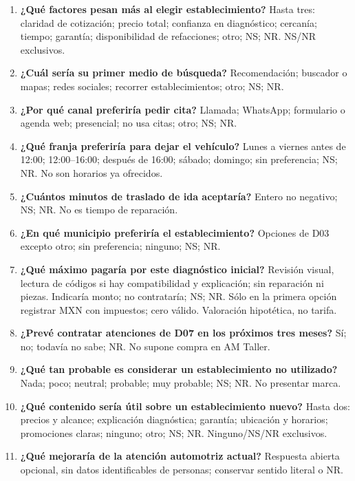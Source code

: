{\begin{enumerate}
\item[D12.] \textbf{¿Qué factores pesan más al elegir establecimiento?} Hasta tres: claridad de cotización; precio total; confianza en diagnóstico; cercanía; tiempo; garantía; disponibilidad de refacciones; otro; NS; NR. NS/NR exclusivos.
\item[D13.] \textbf{¿Cuál sería su primer medio de búsqueda?} Recomendación; buscador o mapas; redes sociales; recorrer establecimientos; otro; NS; NR.
\item[D14.] \textbf{¿Por qué canal preferiría pedir cita?} Llamada; WhatsApp; formulario o agenda web; presencial; no usa citas; otro; NS; NR.
\item[D15.] \textbf{¿Qué franja preferiría para dejar el vehículo?} Lunes a viernes antes de 12:00; 12:00--16:00; después de 16:00; sábado; domingo; sin preferencia; NS; NR. No son horarios ya ofrecidos.
\item[D16.] \textbf{¿Cuántos minutos de traslado de ida aceptaría?} Entero no negativo; NS; NR. No es tiempo de reparación.
\item[D17.] \textbf{¿En qué municipio preferiría el establecimiento?} Opciones de D03 excepto otro; sin preferencia; ninguno; NS; NR.
\item[D18.] \textbf{¿Qué máximo pagaría por este diagnóstico inicial?} Revisión visual, lectura de códigos si hay compatibilidad y explicación; sin reparación ni piezas. Indicaría monto; no contrataría; NS; NR. Sólo en la primera opción registrar MXN con impuestos; cero válido. Valoración hipotética, no tarifa.
\item[D19.] \textbf{¿Prevé contratar atenciones de D07 en los próximos tres meses?} Sí; no; todavía no sabe; NR. No supone compra en AM Taller.
\item[D20.] \textbf{¿Qué tan probable es considerar un establecimiento no utilizado?} Nada; poco; neutral; probable; muy probable; NS; NR. No presentar marca.
\item[D21.] \textbf{¿Qué contenido sería útil sobre un establecimiento nuevo?} Hasta dos: precios y alcance; explicación diagnóstica; garantía; ubicación y horarios; promociones claras; ninguno; otro; NS; NR. Ninguno/NS/NR exclusivos.
\item[D22.] \textbf{¿Qué mejoraría de la atención automotriz actual?} Respuesta abierta opcional, sin datos identificables de personas; conservar sentido literal o NR.
\end{enumerate}
}
